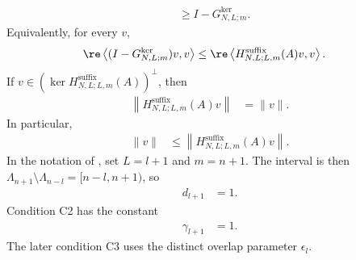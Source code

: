 \begin{lemma}
\begin{align}
         & \geq I-G^{\ker}_{N,L;m}.
        \label{eq:open_suffix_parent_hamiltonian_c2}
    \end{align}
    Equivalently, for every $v$,
    \begin{align}
        \re\left\langle (I-G^{\ker}_{N,L;m})v,v\right\rangle
         & \leq
        \re\left\langle H^{\mathrm{suffix}}_{N,L;L,m}(A)v,v\right\rangle.
        \label{eq:open_suffix_parent_hamiltonian_c2_form}
    \end{align}
    If $v\in(\ker H^{\mathrm{suffix}}_{N,L;L,m}(A))^\perp$, then
    \begin{align}
        \left\lVert H^{\mathrm{suffix}}_{N,L;L,m}(A)v\right\rVert
         & =\lVert v\rVert.
        \label{eq:open_suffix_parent_hamiltonian_norm}
    \end{align}
    In particular,
    \begin{align}
        \lVert v\rVert
         & \leq\left\lVert H^{\mathrm{suffix}}_{N,L;L,m}(A)v\right\rVert.
        \label{eq:open_suffix_parent_hamiltonian_unit_gap}
    \end{align}
    In the notation of \cite{Nachtergaele1996Spectral}, set $L=l+1$ and
    $m=n+1$. The interval is then
    $\Lambda_{n+1}\setminus\Lambda_{n-l}=[n-l,n+1)$, so
    \begin{align}
        d_{l+1}
         & =1.
    \end{align}
    Condition C2 has the constant
    \begin{align}
        \gamma_{l+1}
         & =1.
    \end{align}
    The later condition C3 uses the distinct overlap parameter
    $\epsilon_l$.
\end{lemma}

